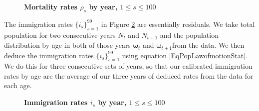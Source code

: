 \documentclass[letterpaper,12pt]{article}
\theoremstyle{definition}
\begin{document}
  \begin{figure}[htbp]\centering \captionsetup{width=4.0in}
    \caption{\label{FigMortRates}\textbf{Mortality rates $\rho_s$ by year, $1\leq s\leq 100$}}
  \end{figure}

  The immigration rates $\{i_s\}_{s=1}^{99}$ in Figure \ref{FigImmigRates} are essentially residuals. We take total population for two consecutive years $N_t$ and $N_{t+1}$ and the population distribution by age in both of those years $\bm{\omega}_{t}$ and $\bm{\omega}_{t+1}$from the \citet{Census:2014} data. We then deduce the immigration rates $\{i_s\}_{s=1}^{99}$ using equation \eqref{EqPopLawofmotionStat}. We do this for three consecutive sets of years, so that our calibrated immigration rates by age are the average of our three years of deduced rates from the data for each age.

  \begin{figure}[htbp]\centering \captionsetup{width=4.0in}
    \caption{\label{FigImmigRates}\textbf{Immigration rates $i_s$ by year, $1\leq s\leq 100$}}
  \end{figure}
\end{document}
